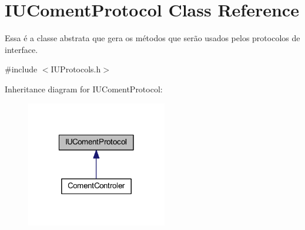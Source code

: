 \hypertarget{class_i_u_coment_protocol}{\section{I\-U\-Coment\-Protocol Class Reference}
\label{class_i_u_coment_protocol}
}


Essa é a classe abstrata que gera os métodos que serão usados pelos protocolos de interface.  




{\ttfamily \#include $<$I\-U\-Protocols.\-h$>$}



Inheritance diagram for I\-U\-Coment\-Protocol\-:\nopagebreak
\begin{figure}[H]
\begin{center}
\leavevmode
\includegraphics[width=174pt]{class_i_u_coment_protocol__inherit__graph}
\end{center}
\end{figure}
